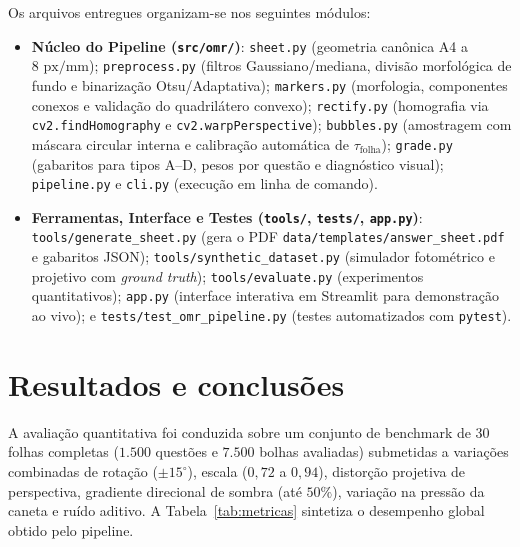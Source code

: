 \documentclass[11pt]{article}
\begin{document}
Os arquivos entregues organizam-se nos seguintes módulos:
\begin{itemize}
\item \textbf{Núcleo do Pipeline (\texttt{src/omr/})}: \texttt{sheet.py} (geometria canônica A4 a $8\text{ px/mm}$); \texttt{preprocess.py} (filtros Gaussiano/mediana, divisão morfológica de fundo e binarização Otsu/Adaptativa); \texttt{markers.py} (morfologia, componentes conexos e validação do quadrilátero convexo); \texttt{rectify.py} (homografia via \texttt{cv2.findHomography} e \texttt{cv2.warpPerspective}); \texttt{bubbles.py} (amostragem com máscara circular interna e calibração automática de $\tau_{\text{folha}}$); \texttt{grade.py} (gabaritos para tipos A--D, pesos por questão e diagnóstico visual); \texttt{pipeline.py} e \texttt{cli.py} (execução em linha de comando).
\item \textbf{Ferramentas, Interface e Testes (\texttt{tools/}, \texttt{tests/}, \texttt{app.py})}: \texttt{tools/generate\_sheet.py} (gera o PDF \texttt{data/templates/answer\_sheet.pdf} e gabaritos JSON); \texttt{tools/synthetic\_dataset.py} (simulador fotométrico e projetivo com \textit{ground truth}); \texttt{tools/evaluate.py} (experimentos quantitativos); \texttt{app.py} (interface interativa em Streamlit para demonstração ao vivo); e \texttt{tests/test\_omr\_pipeline.py} (testes automatizados com \texttt{pytest}).
\end{itemize}

\section{Resultados e conclusões}

A avaliação quantitativa foi conduzida sobre um conjunto de benchmark de 30 folhas completas ($1.500$ questões e $7.500$ bolhas avaliadas) submetidas a variações combinadas de rotação ($\pm 15^\circ$), escala ($0{,}72$ a $0{,}94$), distorção projetiva de perspectiva, gradiente direcional de sombra (até $50\%$), variação na pressão da caneta e ruído aditivo. A Tabela~\ref{tab:metricas} sintetiza o desempenho global obtido pelo pipeline.
\end{document}
